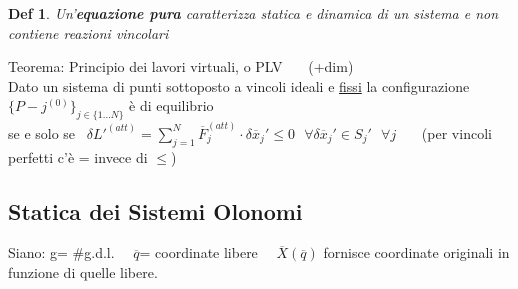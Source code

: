 \documentclass{article}
\theoremstyle{unnumbered}
\newtheorem* {theoremT}{Def}
\theoremstyle{unnumbered1}
\newenvironment{defi}{\begin{gBox}\begin{theoremT}}{\end{theoremT}\end{gBox}}
\begin{document}
%
\begin{defi}
Un'\textbf{equazione pura} caratterizza statica e dinamica di un sistema e non contiene reazioni vincolari
\end{defi}
%
%
%
Teorema: Principio dei lavori virtuali, o PLV \ \ \ (+dim)\\
\phantom{\ } Dato un sistema di punti sottoposto a vincoli ideali e \underline{fissi} la configurazione $\{P-j^{(0)}\}_{j\in\{1...N\}}$ è di equilibrio\\ \phantom{\ \ } se e solo se \ $\delta L'^{(att)}=\sum^N_{j=1}\overline{F}_j^{(att)}\cdot \delta \overline{x}_j'\leq 0 \ \ \  \forall\delta\overline{x}_j'\in S_j' \ \ \ \forall j$ \ \ \ (per vincoli perfetti c'è = invece di $\leq$)

\newpage

\subsection{Statica dei Sistemi Olonomi}
%
Siano: g= $\#$g.d.l. \ \ $\overline{q}$= coordinate libere \ \ $\overline{X}(\overline{q})$ fornisce coordinate originali in funzione di quelle libere.
\end{document}
